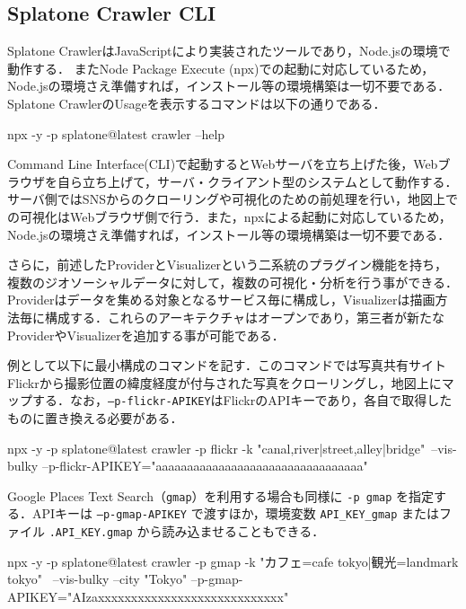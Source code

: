\documentclass[11pt,a4paper]{jlreq}
\begin{document}
\subsection{Splatone Crawler CLI}
Splatone CrawlerはJavaScriptにより実装されたツールであり，Node.jsの環境で動作する．
またNode Package Execute (npx)での起動に対応しているため，Node.jsの環境さえ準備すれば，インストール等の環境構築は一切不要である．
Splatone CrawlerのUsageを表示するコマンドは以下の通りである．

\begin{commandline}
npx -y -p splatone@latest crawler --help
\end{commandline}


Command Line Interface(CLI)で起動するとWebサーバを立ち上げた後，Webブラウザを自ら立ち上げて，サーバ・クライアント型のシステムとして動作する．
サーバ側ではSNSからのクローリングや可視化のための前処理を行い，地図上での可視化はWebブラウザ側で行う．また，npxによる起動に対応しているため，Node.jsの環境さえ準備すれば，インストール等の環境構築は一切不要である．

さらに，前述したProviderとVisualizerという二系統のプラグイン機能を持ち，複数のジオソーシャルデータに対して，複数の可視化・分析を行う事ができる．
Providerはデータを集める対象となるサービス毎に構成し，Visualizerは描画方法毎に構成する．これらのアーキテクチャはオープンであり，第三者が新たなProviderやVisualizerを追加する事が可能である．

例として以下に最小構成のコマンドを記す．このコマンドでは写真共有サイトFlickrから撮影位置の緯度経度が付与された写真をクローリングし，地図上にマップする．なお，\texttt{--p-flickr-APIKEY}はFlickrのAPIキーであり，各自で取得したものに置き換える必要がある．

\begin{commandline}
npx -y -p splatone@latest crawler -p flickr -k "canal,river|street,alley|bridge"\
--vis-bulky --p-flickr-APIKEY="aaaaaaaaaaaaaaaaaaaaaaaaaaaaaaaaa"
\end{commandline}

Google Places Text Search（\texttt{gmap}）を利用する場合も同様に \texttt{-p gmap} を指定する．APIキーは \texttt{--p-gmap-APIKEY} で渡すほか，環境変数 \texttt{API\_KEY\_gmap} またはファイル \texttt{.API\_KEY.gmap} から読み込ませることもできる．

\begin{commandline}
npx -y -p splatone@latest crawler -p gmap -k "カフェ=cafe tokyo|観光=landmark tokyo" \
--vis-bulky --city "Tokyo" --p-gmap-APIKEY="AIzaxxxxxxxxxxxxxxxxxxxxxxxxxxxx"
\end{commandline}
\end{document}
